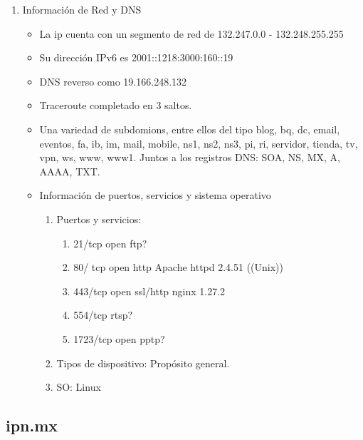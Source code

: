 \begin{enumerate}
    \item Información de Red y DNS
    \begin{itemize}
        \item La ip cuenta con un segmento de red de 132.247.0.0 - 132.248.255.255
        \item Su dirección IPv6 es 2001::1218:3000:160::19
        \item DNS reverso como 19.166.248.132
        \item Traceroute completado en 3 saltos.
        \item Una variedad de subdomions, entre ellos del tipo blog, bq, dc, email, eventos, fa, ib, im, mail, mobile, ns1, ns2, ns3, pi, ri, servidor, tienda, tv, vpn, ws, www, www1. Juntos a los registros DNS: SOA, NS, MX, A, AAAA, TXT.

        \item Información de puertos, servicios y sistema operativo
        
        \begin{enumerate}
            \item Puertos y servicios:
            \begin{enumerate}
                \item 21/tcp open ftp?
                \item 80/ tcp open http Apache httpd 2.4.51 ((Unix))
                \item 443/tcp open ssl/http nginx 1.27.2
                \item 554/tcp rtsp?
                \item 1723/tcp open pptp?  
            \end{enumerate}

            \item Tipos de dispositivo: Propósito general.
            \item SO: Linux
        \end{enumerate}
    \end{itemize}
\end{enumerate}

\subsection{ipn.mx}


